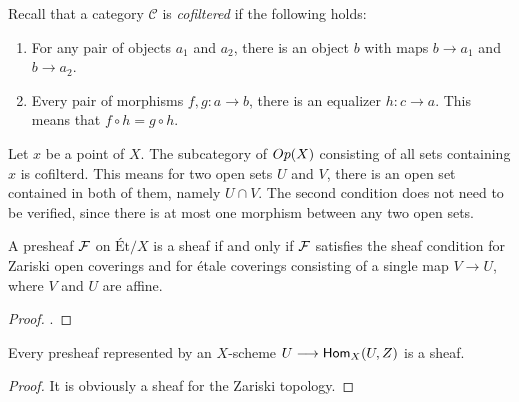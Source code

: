 \begin{remark}
  Recall that a category $\mathcal{C}$ is \textit{cofiltered} if the following holds:
  \begin{enumerate}
    \item For any pair of objects $a_1$ and $a_2$, there is an object $b$ with maps $b \to a_1$ and $b \to a_2$.
    \item Every pair of morphisms $f,g: a \to b$, there is an equalizer $h: c \to a$. This means that $f \circ h = g \circ h$.
  \end{enumerate} 
  Let $x$ be a point of $X$. The subcategory of $Op(X)$ consisting of all sets containing $x$ is cofilterd. This means for two open sets $U$ and $V$, there is an open set contained in both of them, namely $U \cap V$. The second condition does not need to be verified, since there is at most one morphism between any two open sets.
\end{remark}

\begin{theorem}
  A presheaf $\mathcal{F}$ on $\text{\'Et}/X$ is a sheaf if and only if $\mathcal{F}$ satisfies the sheaf condition for Zariski open coverings and for \'etale coverings consisting of a single map $V \to U$, where $V$ and $U$ are affine.
\end{theorem}
\begin{proof}
  \cite{milneLEC}.
\end{proof}
\begin{corollary}
  Every presheaf represented by an $X$-scheme $U \longrightarrow \mathsf{Hom}_X(U,Z)$ is a sheaf. 
\end{corollary}
\begin{proof}
  It is obviously a sheaf for the Zariski topology. 
\end{proof}



